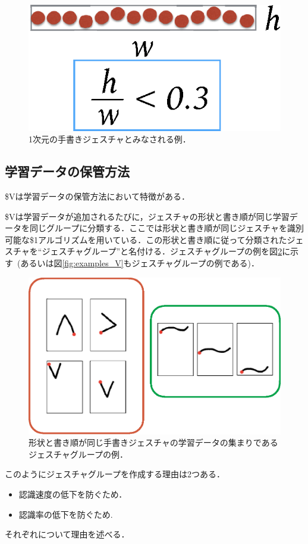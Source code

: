 \begin{figure} [h!]
	\begin{center}
		\includegraphics [width=0.3\hsize ]{img/1D.eps}
	\end{center}
	\caption{1次元の手書きジェスチャとみなされる例．}
	\label{fig:1D}
\end{figure}


\subsection{学習データの保管方法}
\$Vは学習データの保管方法において特徴がある．

\$Vは学習データが追加されるたびに，ジェスチャの形状と書き順が同じ学習データを同じグループに分類する．ここでは形状と書き順が同じジェスチャを識別可能な\$1アルゴリズムを用いている．この形状と書き順に従って分類されたジェスチャを``ジェスチャグループ''と名付ける．ジェスチャグループの例を図\ref{fig:gesture_group}に示す~(あるいは図\ref{fig:examples_V}もジェスチャグループの例である)．

\begin{figure} [h!]
	\begin{center}
		\includegraphics [width=0.7\hsize ]{img/gesture_group.eps}
	\end{center}
	\caption{形状と書き順が同じ手書きジェスチャの学習データの集まりであるジェスチャグループの例．}
	\label{fig:gesture_group}
\end{figure}

このようにジェスチャグループを作成する理由は2つある．
\begin{itemize}
\item 認識速度の低下を防ぐため．
\item 認識率の低下を防ぐため.
\end{itemize}
それぞれについて理由を述べる．


